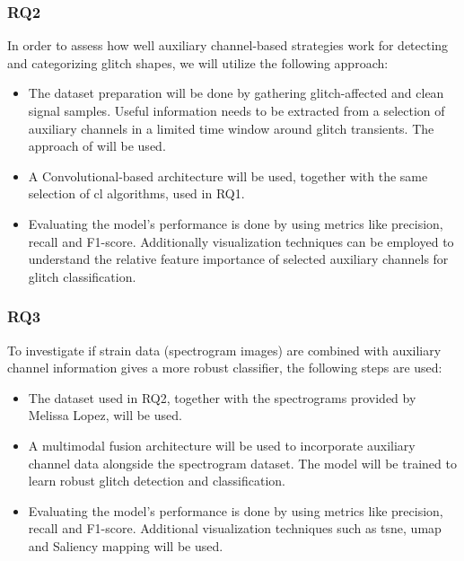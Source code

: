 \subsubsection{RQ2}
In order to assess how well auxiliary channel-based strategies work for detecting and categorizing glitch shapes, we will utilize the following approach:
\begin{itemize}
    \item The dataset preparation will be done by gathering glitch-affected and clean signal samples. Useful information needs to be extracted from a selection of auxiliary channels in a limited time window around glitch transients. The approach of \citep{colgan2020efficient} will be used. 
    \item A Convolutional-based architecture will be used, together with the same selection of \acrshort{cl} algorithms, used in RQ1. 
    \item Evaluating the model's performance is done by using metrics like precision, recall and F1-score. Additionally visualization techniques can be employed to understand the relative feature importance of selected auxiliary channels for glitch classification. 
\end{itemize}
\subsubsection{RQ3}
To investigate if strain data (spectrogram images) are combined with auxiliary channel information gives a more robust classifier, the following steps are used:
\begin{itemize}
    \item The dataset used in RQ2, together with the spectrograms provided by Melissa Lopez, will be used. 
    \item A multimodal fusion architecture will be used to incorporate auxiliary channel data alongside the spectrogram dataset. The model will be trained to learn robust glitch detection and classification. 
    \item Evaluating the model's performance is done by using metrics like precision, recall and F1-score. Additional visualization techniques such as \acrshort{tsne}, \acrshort{umap} and Saliency mapping will be used. 
\end{itemize}

